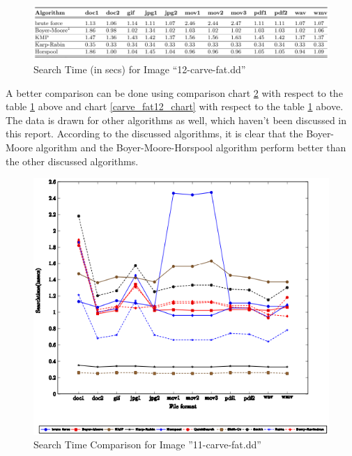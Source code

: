 \documentclass[12pt]{article}
\begin{document}
\begin{figure}[h]
\centering
\includegraphics[width=\textwidth]{./images/Search Time (in secs) for Image “12-carve-fat.dd”.png}
\caption{Search Time (in secs) for Image “12-carve-fat.dd” \textcite{yi_chang_2015}}\label{carve_fat12_data}
\end{figure}

A better comparison can be done using comparison chart \ref{carve_fat11_chart} with respect to the table \ref{carve_fat12_data} above and chart \ref{carve_fat12_chart} with respect to the table \ref{carve_fat12_data} above. The data is drawn for other algorithms as well, which haven't been discussed in this report. According to the discussed algorithms, it is clear that the Boyer-Moore algorithm and the Boyer-Moore-Horspool algorithm perform better than the other discussed algorithms.

\begin{figure}[p]
\centering
\includegraphics[width=\textwidth]{./images/Search Time Comparison for Image ”11-carve-fat.dd”.png}
\caption{Search Time Comparison for Image ”11-carve-fat.dd” \textcite{yi_chang_2015}}\label{carve_fat11_chart}
\end{figure}
\end{document}
